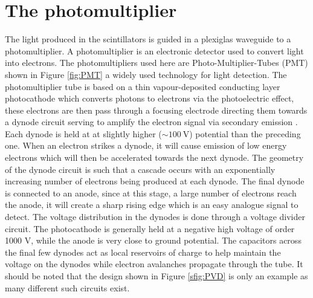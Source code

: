 \section{The photomultiplier}

The light produced in the scintillators is guided in a plexiglas waveguide to a photomultiplier. A photomultiplier is an electronic detector used to convert light into electrons. The photomultipliers used here are Photo-Multiplier-Tubes (PMT) shown in Figure \ref{fig:PMT} a widely used technology for light detection. The photomultiplier tube is based on a thin vapour-deposited conducting layer photocathode which converts photons to electrons via the photoelectric effect, these electrons are then pass through a focusing electrode directing them towards a dynode circuit serving to amplify the electron signal via secondary emission \cite{Dekker1981}. Each dynode is held at at slightly higher ($\sim \SI{100}{\volt}$) potential than the preceding one. When an electron strikes a dynode, it will cause emission of low energy electrons which will then be accelerated towards the next dynode. The geometry of the dynode circuit is such that a cascade occurs with an exponentially increasing number of electrons being produced at each dynode. The final dynode is connected to an anode, since at this stage, a large number of electrons reach the anode, it will create a sharp rising edge which is an easy analogue signal to detect. The voltage distribution in the dynodes is done through a voltage divider circuit. The photocathode is generally held at a negative high voltage of order 1000 V, while the anode is very close to ground potential. The capacitors across the final few dynodes act as local reservoirs of charge to help maintain the voltage on the dynodes while electron avalanches propagate through the tube. It should be noted that the design shown in Figure \ref{sfig:PVD} is only an example as many different such circuits exist.

